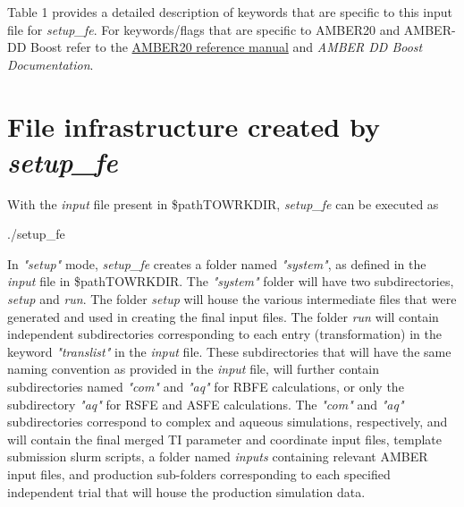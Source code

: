 \documentclass[11pt,letterpaper,titlepage]{article}
\begin{document}
Table 1 provides a detailed description of keywords that are specific to this input file for 
\textit{setup\_fe}. 
For keywords/flags that are specific to AMBER20 and AMBER-DD Boost refer to the 
\href{https://ambermd.org/doc12/Amber20.pdf}{AMBER20 reference manual}
and \textit{AMBER DD Boost Documentation}.

\vspace{0.1cm}
\section{File infrastructure created by \textit{setup\_fe}}
\vspace{0.1cm}

With the \textit{input} file present in \$pathTOWRKDIR, \textit{setup\_fe} can be executed as 

\vspace{0.1cm}
\centerline{./setup\_fe}
\vspace{0.1cm}


\vspace{0.1cm}
\setlength{\fboxrule}{2pt}
\setlength{\fboxsep}{2pt}
\vspace{0.1cm}



In \textit{"setup"} mode, \textit{setup\_fe} creates a folder named \textit{"system"}, as defined 
in the \textit{input} file in \$pathTOWRKDIR. 
The \textit{"system"} folder will have two subdirectories, \textit{setup} and \textit{run}. The folder
\textit{setup} will house the  various intermediate files that were generated and used in creating 
the final input files. The folder \textit{run} will contain independent subdirectories corresponding 
to each entry (transformation) in the keyword \textit{"translist"} in the \textit{input} file. These 
subdirectories that will have the same naming convention as provided in the \textit{input} file, 
will further contain subdirectories named \textit{"com"} and \textit{"aq"} for RBFE calculations, or 
only the subdirectory \textit{"aq"} for RSFE and ASFE calculations. The \textit{"com"} and \textit{"aq"}
subdirectories correspond to complex and aqueous simulations, respectively, and will contain 
the final merged TI parameter and coordinate input files, template submission slurm scripts, a folder
named \textit{inputs} containing relevant AMBER input files, and production sub-folders corresponding 
to each specified independent trial that will house the production simulation data. 
\end{document}
